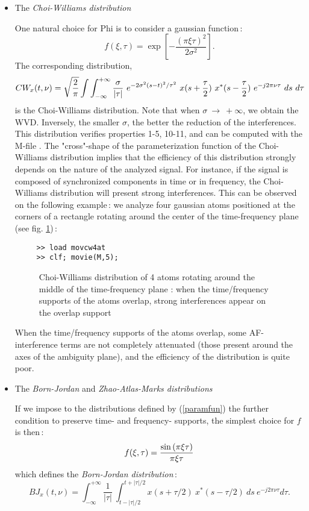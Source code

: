\begin{itemize}
\item The {\it Choi-Williams distribution	}

  One natural choice for Phi is to consider a gaussian function\,:
\[f(\xi,\tau)=\exp{\left[-\frac{(\pi \xi \tau)^2}{2\sigma^2}\right]}.\]
The corresponding distribution,
\[CW_x(t,\nu)=\sqrt{\frac{2}{\pi}}
\int\int_{-\infty}^{+\infty} 
{\sigma\over |\tau|}\
e^{-2\sigma^2(s-t)^2/\tau^2}\ x(s+\frac{\tau}{2})\ x^*(s-\frac{\tau}{2})\
e^{-j2\pi \nu \tau}\ ds\ d\tau\] is the Choi-Williams distribution. Note
that when $\sigma\ \longrightarrow\ +\infty$, we obtain the WVD. Inversely,
the smaller $\sigma$, the better the reduction of the interferences. This
distribution verifies properties 1-5, 10-11, and can be computed with the
M-file \index{\ttfamily tfrcw}{\ttfamily tfrcw.m}.  The "cross"-shape of
the parameterization function of the Choi-Williams distribution implies that
the efficiency of this distribution strongly depends on the nature of the
analyzed signal. For instance, if the signal is composed of synchronized
components in time or in frequency, the Choi-Williams distribution will
present strong interferences. This can be observed on the following
example\,: we analyze four gaussian atoms positioned at the corners of a
rectangle rotating around the center of the time-frequency plane (see
fig. \ref{En1fig15})\,:
\begin{verbatim}
     >> load movcw4at
     >> clf; movie(M,5);
\end{verbatim}
\begin{figure}[htb]
\epsfxsize=10cm
\epsfysize=8cm
\centerline{}
\caption{\label{En1fig15}Choi-Williams distribution of 4 atoms rotating
around the middle of the time-frequency plane : when the time/frequency
supports of the atoms overlap, strong interferences appear on the overlap
support}
\end{figure}
When the time/frequency supports of the atoms overlap, some AF-interference
terms are not completely attenuated (those present around the axes of
the ambiguity plane), and the efficiency of the distribution is quite poor. 

\item The {\it Born-Jordan} and {\it Zhao-Atlas-Marks distributions}

  If we impose to the distributions defined by (\ref{paramfun}) the further
condition to preserve time- and frequency- supports, the simplest choice
for $f$ is then\,:
\[f(\xi,\tau)={\sin{(\pi \xi \tau)}\over\pi \xi \tau}\]    	
which defines the {\it Born-Jordan distribution}\,:
\[BJ_x(t,\nu)=\int_{-\infty}^{+\infty} \frac{1}{|\tau|}\
\int_{t-|\tau|/2}^{t+|\tau|/2} x(s+\tau/2)\ x^*(s-\tau/2)\ ds\ e^{-j2\pi
\nu \tau} d\tau.\]  


\end{itemize}
